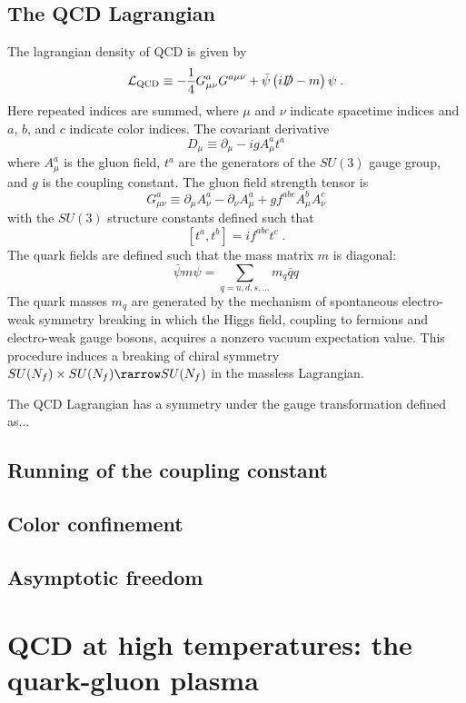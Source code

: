 \subsection{The QCD Lagrangian}
The lagrangian density of QCD is given by
\begin{equation}
  \mathcal{L}_\mathrm{QCD} \equiv -\frac{1}{4} G^a_{\mu\nu}G^{a\mu\nu} + \bar{\psi} \left( i \slashed{D} - m \right) \psi \; .
\end{equation}
Here repeated indices are summed, where $\mu$ and $\nu$ indicate spacetime indices and $a$, $b$, and $c$ indicate color indices.
The covariant derivative
\[ D_\mu \equiv \partial_\mu - i g A^a_\mu t^a\]
where $A^a_\mu$ is the gluon field, $t^a$ are the generators of the $SU(3)$ gauge group, and $g$ is the coupling constant.
The gluon field strength tensor is
\[ G^a_{\mu\nu} \equiv \partial_\mu A^a_\nu - \partial_\nu A^a_\mu + g f^{abc} A^b_\mu A^c_\nu \]
with the $SU(3)$ structure constants defined such that
\[ [t^a,t^b] = if^{abc}t^c \; .\]
The quark fields are defined such that the mass matrix $m$ is diagonal:
\[ \bar{\psi}m\psi = \sum_{q = u,d,s,\ldots} m_{q}\bar{q}q \]
The quark masses $m_q$ are generated by the mechanism of spontaneous electro-weak symmetry breaking in which the Higgs field, coupling to fermions and electro-weak gauge bosons, acquires a nonzero vacuum expectation value.
This procedure induces a breaking of chiral symmetry $SU(N_f) \times SU(N_f) \rarrow SU(N_f)$ in the massless Lagrangian. %

The QCD Lagrangian has a symmetry under the gauge transformation defined as...

\subsection{Running of the coupling constant} %
\subsection{Color confinement}
\subsection{Asymptotic freedom}

\section{QCD at high temperatures: the quark-gluon plasma}
